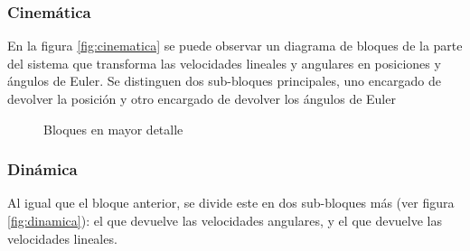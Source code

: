 \documentclass[main]{subfiles}
\begin{document}
\subsubsection{Cinem\'atica}

En la figura \ref{fig:cinematica} se puede observar un diagrama de bloques de la parte del sistema que transforma las velocidades lineales y angulares en posiciones y \'angulos de Euler. Se distinguen dos sub-bloques principales, uno encargado de devolver la  posici\'on y otro encargado de devolver los \'angulos de Euler
\begin{figure} [h!]
  \centering
  \caption{Bloques en mayor detalle}
  \label{fig:bloques}
\end{figure}



\subsubsection{Din\'amica}

Al igual que el bloque anterior, se divide este en dos sub-bloques m\'as (ver figura \ref{fig:dinamica}): el que devuelve las velocidades angulares, y el que devuelve las velocidades lineales. 
\end{document}
